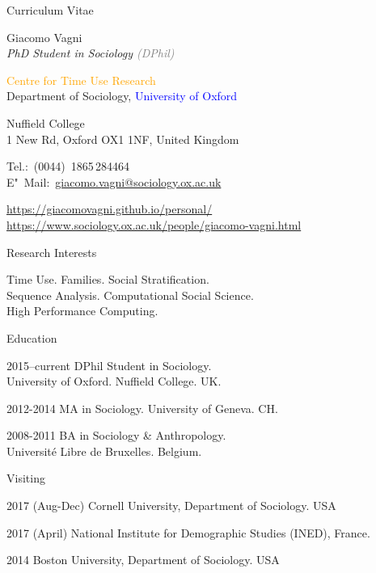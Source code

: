 \documentclass[12pt,a4paper]{article}
\begin{document}
\begin{cv}{Curriculum Vitae}
  \begin{cvlist}{}
  \item \colorbox{mygray} {Giacomo Vagni}\\
  \emph{PhD Student in Sociology \textcolor{Gray}{(DPhil)}}
  
    \textcolor{Orange} {Centre for Time Use Research} \\
     Department of Sociology, \textcolor{Blue}{University of Oxford} 
    \item Nuffield College \\ 
    1 New Rd, Oxford OX1 1NF, United Kingdom
  \item Tel.:~(0044)~1865\,284464\\
    E"~Mail:~\href{mailto:giacomo.vagni@sociology.ox.ac.uk}{giacomo.vagni@sociology.ox.ac.uk}
    
    \item \href{https://giacomovagni.github.io/personal/} {https://giacomovagni.github.io/personal/} \\ 
     \href{https://www.sociology.ox.ac.uk/people/giacomo-vagni.html} {https://www.sociology.ox.ac.uk/people/giacomo-vagni.html} \\
    
  \end{cvlist}
  
  \begin{cvlist}{Research Interests}
  \item[] Time Use. Families. Social Stratification. \\  Sequence Analysis. Computational Social Science. \\ High Performance Computing. 
  \end{cvlist}
  
  \begin{cvlist}{Education}
  \item[2015--current] DPhil Student in Sociology. \\ University of Oxford. Nuffield College. UK. 
  \item[2012-2014] MA in Sociology. University of Geneva. CH. 
  \item[2008-2011] BA in Sociology \& Anthropology. \\ Universit{\'e} Libre de Bruxelles. Belgium. 
  \end{cvlist}
  
      \begin{cvlist}{Visiting}
      	\item[2017 (Aug-Dec)] Cornell University, Department of Sociology. USA 
      	\item[2017 (April)] National Institute for Demographic Studies (INED), France. 
      	\item[2014] Boston University, Department of Sociology. USA
      \end{cvlist}
      

\end{cv}
\end{document}
